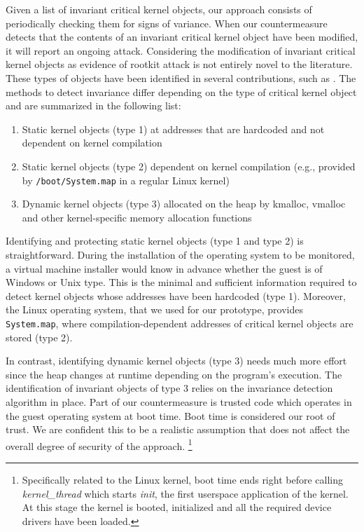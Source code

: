 Given a list of invariant critical kernel objects, our approach consists of periodically checking them for signs of variance. When our countermeasure detects that the contents of an invariant critical kernel object have been modified, it will report an ongoing attack. 
Considering the modification of invariant critical kernel objects as evidence of rootkit attack is not entirely novel to the literature. These types of objects have been identified in several contributions, such as \cite{HookSafe,6,7,8}. The methods to detect invariance differ depending on the type of critical kernel object and are summarized in the following list:

\begin{enumerate}
\item Static kernel objects (type 1) at addresses that are hardcoded and not dependent on kernel compilation 
\item Static kernel objects (type 2) dependent on kernel compilation (e.g., provided by \texttt{/boot/System.map} in a regular Linux kernel)
\item Dynamic kernel objects (type 3) allocated on the heap by kmalloc, vmalloc and other kernel-specific memory allocation functions
\end{enumerate}

Identifying and protecting static kernel objects (type 1 and type 2) is straightforward. During the installation of the operating system to be monitored, a virtual machine installer would know in advance whether the guest is of Windows or Unix type. This is the minimal and sufficient information required to detect kernel objects whose addresses have been hardcoded (type 1). 
Moreover, the  Linux operating system, that we used for our prototype, provides \texttt{System.map}, where compilation-dependent addresses of critical kernel objects are stored (type 2). 


In contrast, identifying dynamic kernel objects (type 3) needs much more effort since the heap changes at runtime depending on the program's execution. The identification of invariant objects of type 3 relies on the invariance detection algorithm in place. 
Part of our countermeasure is trusted code which operates in the guest operating system at boot time. Boot time is considered our root of trust. We are confident this to be a realistic assumption that does not affect the overall degree of security of the approach. \footnote{Specifically related to the Linux kernel, boot time ends right before calling \emph{kernel\_thread} which starts \emph{init}, the first userspace application of the kernel. At this stage the kernel is booted, initialized and all the required device drivers have been loaded.}

